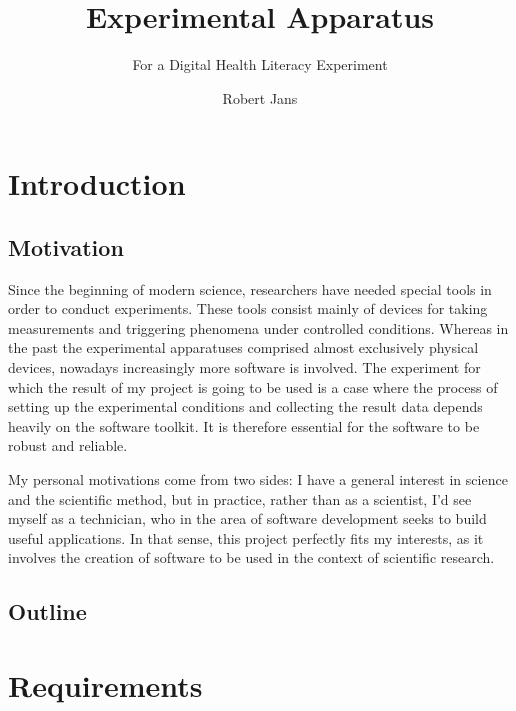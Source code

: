\documentclass[a4paper]{usiinfbachelorproject}
\author{Robert Jans}
\title{\textbf{Experimental Apparatus}}
\subtitle{For a Digital Health Literacy Experiment}
\begin{document}
\maketitle
\tableofcontents\newpage
\listoffigures\newpage

\section{\textbf{Introduction}}

\subsection{\textbf{Motivation}}

Since the beginning of modern science, researchers have needed special tools in order to conduct experiments. These tools consist 
mainly of devices for taking measurements and triggering phenomena under controlled conditions. Whereas in the past the
experimental apparatuses comprised almost exclusively physical devices, nowadays increasingly more software is involved.
The experiment for which the result of my project is going to be used is a case where the process of 
setting up the experimental conditions and collecting the result data depends heavily on the software toolkit. It is therefore
essential for the software to be robust and reliable.

My personal motivations come from two sides: I have a general interest in science and the scientific method, but in practice,
rather than as a scientist,
I'd see myself as a technician, who in the area of software development seeks to build useful applications.
In that sense, this project perfectly fits my interests, as it involves the creation of software to be used in the context of
scientific research.    

\subsection{\textbf{Outline}}



\section{\textbf{Requirements}} \label{sec:req}
\end{document}
